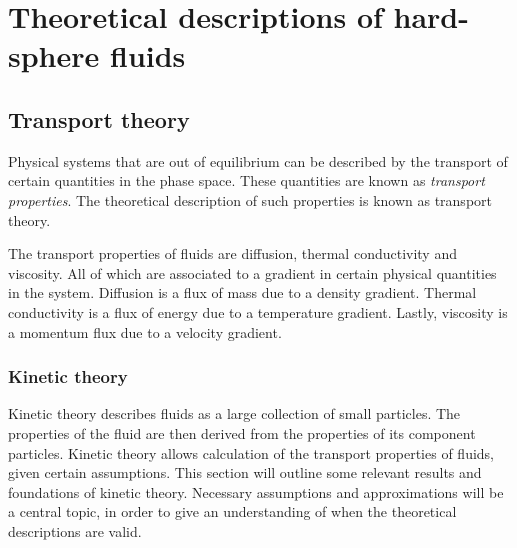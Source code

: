 \chapter{Theoretical descriptions of hard-sphere fluids}
\label{sec:theory}

\section{Transport theory}
\label{sec:theory:transport_theory}
Physical systems that are out of equilibrium
can be described by the transport of certain
quantities in the phase space. These quantities
are known as \emph{transport properties}. The
theoretical description of such properties is 
known as transport theory.


The transport properties of fluids are diffusion, 
thermal conductivity and viscosity. All of which
are associated to a gradient in certain physical
quantities in the system. Diffusion is a flux of 
mass due to a density gradient. Thermal conductivity 
is a flux of energy due to a temperature gradient.
Lastly, viscosity is a momentum flux due to a
velocity gradient. 


\subsection{Kinetic theory}
\label{sec:theory:kinetic_theory}
Kinetic theory describes fluids as a large 
collection of small particles. The properties 
of the fluid are then derived from the properties 
of its component particles. Kinetic theory allows 
calculation of the transport properties of fluids, 
given certain assumptions. This section will outline 
some relevant results and foundations of kinetic 
theory. Necessary assumptions and approximations 
will be a central topic, in order to give an 
understanding of when the theoretical descriptions 
are valid.


